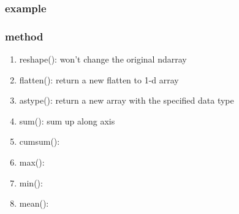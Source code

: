 \documentclass[11pt]{article}
\begin{document}
\subsubsection{example}
\label{sec:org5c6dd75}
\subsubsection{method}
\label{sec:org471267e}
\begin{enumerate}
\item reshape(): won't change the original ndarray
\label{sec:orgd9a9226}
\item flatten(): return a new flatten to 1-d array
\label{sec:orgbf30283}
\item astype(): return a new array with the specified data type
\label{sec:org8b0186c}
\item sum(): sum up along axis
\label{sec:orga22dc29}
\item cumsum():
\label{sec:org515bb4d}
\item max():
\label{sec:org3a48d27}
\item min():
\label{sec:orgeff4bd2}
\item mean():
\label{sec:orgde48305}
\end{enumerate}
\end{document}
